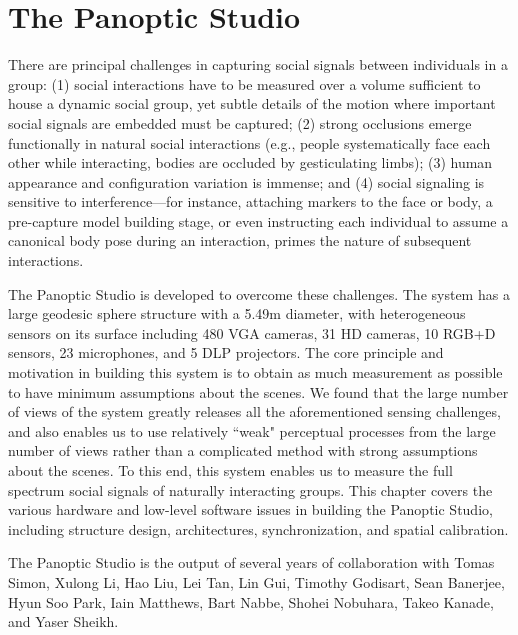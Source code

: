 \chapter{The Panoptic Studio}%
\label{chapter:system}

There are principal challenges in capturing social signals between individuals in a group: (1) social interactions have to be measured over a volume sufficient to house a dynamic social group, yet subtle details of the motion where important social signals are embedded must be captured; (2) strong occlusions emerge functionally in natural social interactions (e.g., people systematically face each other while interacting, bodies are occluded by gesticulating limbs); (3) human appearance and configuration variation is immense; and (4) social signaling is sensitive to interference---for instance, attaching markers to the face or body, a pre-capture model building stage, or even instructing each individual to assume a canonical body pose during an interaction, primes the nature of subsequent interactions. 

The Panoptic Studio is developed to overcome these challenges. The system has a large geodesic sphere structure with a 5.49m diameter, with heterogeneous sensors on its surface including 480 VGA cameras, 31 HD cameras, 10 RGB+D sensors, 23 microphones, and 5 DLP projectors. The core principle and motivation in building this system is to obtain as much measurement as possible to have minimum assumptions about the scenes. We found that the large number of views of the system greatly releases all the aforementioned sensing challenges, and also enables us to use relatively ``weak" perceptual processes from the large number of views 	rather than a complicated method with strong assumptions about the scenes. To this end, this system enables us to measure the full spectrum social signals of naturally interacting groups. This chapter covers the various hardware and low-level software issues in building the Panoptic Studio, including structure design, architectures, synchronization, and spatial calibration.  

The Panoptic Studio is the output of several years of collaboration with Tomas Simon, Xulong Li, Hao Liu, Lei Tan, Lin Gui, Timothy Godisart, Sean Banerjee, Hyun Soo Park, Iain Matthews, Bart Nabbe, Shohei Nobuhara, Takeo Kanade, and Yaser Sheikh. 

